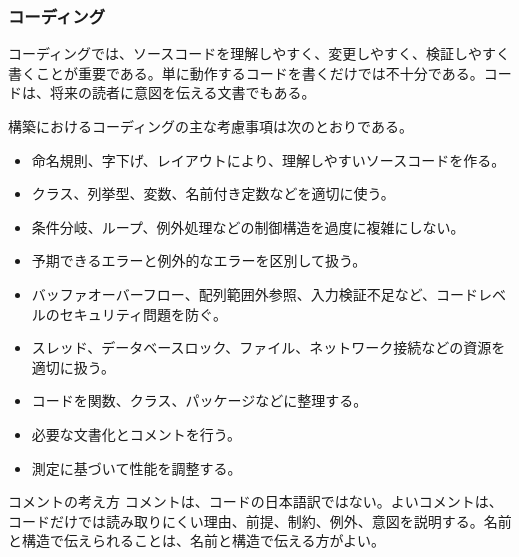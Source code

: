 \subsubsection{コーディング}

コーディングでは、ソースコードを理解しやすく、変更しやすく、検証しやすく書くことが重要である。単に動作するコードを書くだけでは不十分である。コードは、将来の読者に意図を伝える文書でもある。

構築におけるコーディングの主な考慮事項は次のとおりである。

\begin{itemize}
  \item 命名規則、字下げ、レイアウトにより、理解しやすいソースコードを作る。
  \item クラス、列挙型、変数、名前付き定数などを適切に使う。
  \item 条件分岐、ループ、例外処理などの制御構造を過度に複雑にしない。
  \item 予期できるエラーと例外的なエラーを区別して扱う。
  \item バッファオーバーフロー、配列範囲外参照、入力検証不足など、コードレベルのセキュリティ問題を防ぐ。
  \item スレッド、データベースロック、ファイル、ネットワーク接続などの資源を適切に扱う。
  \item コードを関数、クラス、パッケージなどに整理する。
  \item 必要な文書化とコメントを行う。
  \item 測定に基づいて性能を調整する。
\end{itemize}

\begin{keybox}{コメントの考え方}
コメントは、コードの日本語訳ではない。よいコメントは、コードだけでは読み取りにくい理由、前提、制約、例外、意図を説明する。名前と構造で伝えられることは、名前と構造で伝える方がよい。
\end{keybox}
